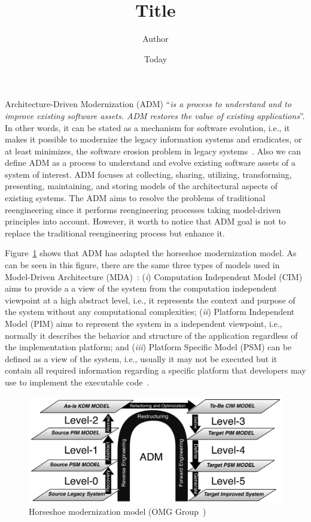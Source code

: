 \documentclass[]{article}
\begin{document}
\title{Title}
\author{Author}
\date{Today}
\maketitle

Architecture-Driven Modernization (ADM) ``\textit{is a process to understand and to improve existing software assets. ADM restores the value of existing applications}''. In other words, it can be stated  as a mechanism for software evolution, i.e., it makes it possible to modernize the legacy information systems and eradicates, or at least minimizes, the software erosion problem in legacy systems~\cite{OMGADM}. Also we can define ADM as a process to understand and evolve existing software assets of a system of interest. ADM focuses at collecting, sharing, utilizing, transforming, presenting, maintaining, and storing models of the architectural aspects of existing systems. The ADM aims to resolve the problems of traditional reengineering since it performs reengineering processes taking model-driven principles into account. However, it worth to notice that ADM goal is not to replace the traditional reengineering process but enhance it. 

Figure~\ref{fig:horseshoe} shows that ADM has adapted the horseshoe modernization model. As can be seen in this figure, there are the same three types of models used in Model-Driven Architecture (MDA)~\cite{ThomasMDA}: (\textit{i}) Computation Independent Model (CIM) aims to provide a  a view of the system from the computation independent viewpoint at a high abstract level, i.e., it represents the context and purpose of the system without any computational complexities; (\textit{ii}) Platform Independent Model (PIM) aims to represent the system in a independent viewpoint, i.e., normally it describes the behavior and structure of the application regardless of the implementation platform; and (\textit{iii}) Platform Specific Model (PSM) can be defined as a view of the system, i.e., usually it may not be executed but it contain all required information regarding a specific platform that developers may use to implement the executable code~\cite{Deltombe, 5440163, ThomasMDA}.

\begin{figure}[t]
\centering
  \includegraphics[scale=0.6]{Figure/processoDaFerramenta}
\caption{Horseshoe modernization model (OMG Group~\cite{OMGADM})}
\label{fig:horseshoe}
\end{figure}
\end{document}
